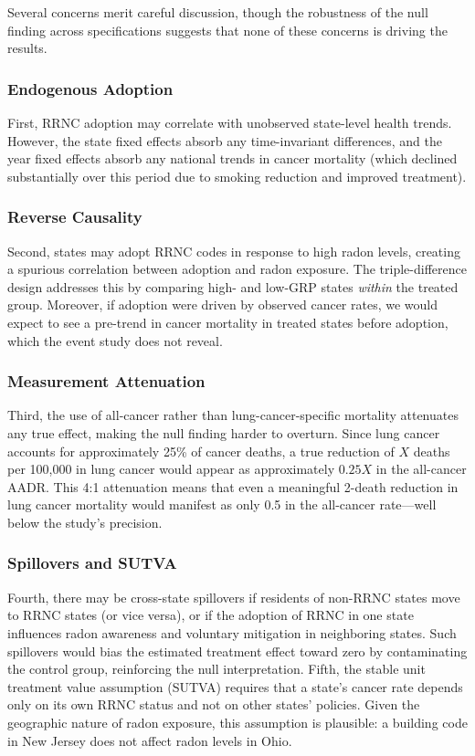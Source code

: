 \documentclass[12pt]{article}
\begin{document}
Several concerns merit careful discussion, though the robustness of the null finding across specifications suggests that none of these concerns is driving the results.

\subsubsection*{Endogenous Adoption} First, RRNC adoption may correlate with unobserved state-level health trends. However, the state fixed effects absorb any time-invariant differences, and the year fixed effects absorb any national trends in cancer mortality (which declined substantially over this period due to smoking reduction and improved treatment). \subsubsection*{Reverse Causality} Second, states may adopt RRNC codes in response to high radon levels, creating a spurious correlation between adoption and radon exposure. The triple-difference design addresses this by comparing high- and low-GRP states \emph{within} the treated group. Moreover, if adoption were driven by observed cancer rates, we would expect to see a pre-trend in cancer mortality in treated states before adoption, which the event study does not reveal.

\subsubsection*{Measurement Attenuation} Third, the use of all-cancer rather than lung-cancer-specific mortality attenuates any true effect, making the null finding harder to overturn. Since lung cancer accounts for approximately 25\% of cancer deaths, a true reduction of $X$ deaths per 100,000 in lung cancer would appear as approximately $0.25X$ in the all-cancer AADR. This 4:1 attenuation means that even a meaningful 2-death reduction in lung cancer mortality would manifest as only 0.5 in the all-cancer rate---well below the study's precision.

\subsubsection*{Spillovers and SUTVA} Fourth, there may be cross-state spillovers if residents of non-RRNC states move to RRNC states (or vice versa), or if the adoption of RRNC in one state influences radon awareness and voluntary mitigation in neighboring states. Such spillovers would bias the estimated treatment effect toward zero by contaminating the control group, reinforcing the null interpretation. Fifth, the stable unit treatment value assumption (SUTVA) requires that a state's cancer rate depends only on its own RRNC status and not on other states' policies. Given the geographic nature of radon exposure, this assumption is plausible: a building code in New Jersey does not affect radon levels in Ohio.
\end{document}
